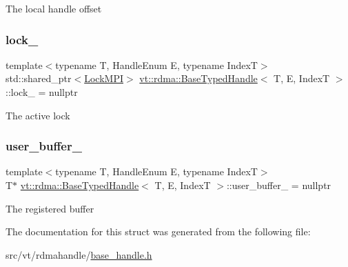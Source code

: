 The local handle offset \mbox{\label{structvt_1_1rdma_1_1_base_typed_handle_accff417789be0a3556fdc4695aba5a85}} 
\subsubsection{\texorpdfstring{lock\+\_\+}{lock\_}}
{\footnotesize\ttfamily template$<$typename T, Handle\+Enum E, typename IndexT$>$ \\
std\+::shared\+\_\+ptr$<$\hyperlink{structvt_1_1rdma_1_1_lock_m_p_i}{Lock\+M\+PI}$>$ \hyperlink{structvt_1_1rdma_1_1_base_typed_handle}{vt\+::rdma\+::\+Base\+Typed\+Handle}$<$ T, E, IndexT $>$\+::lock\+\_\+ = nullptr\hspace{0.3cm}{\ttfamily [protected]}}

The active lock \mbox{\label{structvt_1_1rdma_1_1_base_typed_handle_af48b31b6d8f1319ee58c5544ad251bf9}} 
\subsubsection{\texorpdfstring{user\+\_\+buffer\+\_\+}{user\_buffer\_}}
{\footnotesize\ttfamily template$<$typename T, Handle\+Enum E, typename IndexT$>$ \\
T$\ast$ \hyperlink{structvt_1_1rdma_1_1_base_typed_handle}{vt\+::rdma\+::\+Base\+Typed\+Handle}$<$ T, E, IndexT $>$\+::user\+\_\+buffer\+\_\+ = nullptr\hspace{0.3cm}{\ttfamily [protected]}}

The registered buffer 

The documentation for this struct was generated from the following file\+:\begin{DoxyCompactItemize}
\item 
src/vt/rdmahandle/\hyperlink{base__handle_8h}{base\+\_\+handle.\+h}\end{DoxyCompactItemize}
